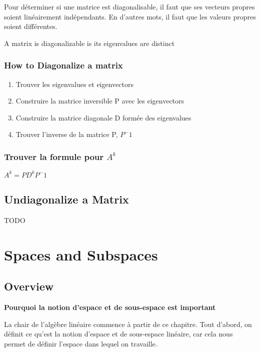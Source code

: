 \documentclass{article}
\begin{document}
Pour déterminer si une matrice est diagonalisable, il faut que ses vecteurs
propres soient linéairement indépendants. En d'autres mots, il faut que les
valeurs propres soient différentes.

\begin{theorem}
    A matrix is diagonalizable is its eigenvalues are distinct
\end{theorem}

\subsubsection{How to Diagonalize a matrix}%
\label{ssub:How to Diagonalize a matrix}

\begin{enumerate}
    \item Trouver les eigenvalues et eigenvectors
    \item Construire la matrice inversible P avec les eigenvectors
    \item Construire la matrice diagonale D formée des eigenvalues
    \item Trouver l'inverse de la matrice P, $P^-1$
\end{enumerate}

\subsubsection{Trouver la formule pour $A^k$}%
\label{ssub:Trouver la formule pour $A^k$}

$ A^k = P D^k P^-1 $

\subsection{Undiagonalize a Matrix}

TODO

\section{Spaces and Subspaces}

\subsection{Overview}%
\label{sub:Overview}

\textbf{Pourquoi la notion d'espace et de sous-espace est important}

La chair de l'algèbre linéaire commence à partir de ce chapitre. Tout
d'abord, on définit ce qu'est la notion d'espace et de sous-espace
linéaire, car cela nous permet de définir l'espace dans lequel on travaille.\\
\end{document}
